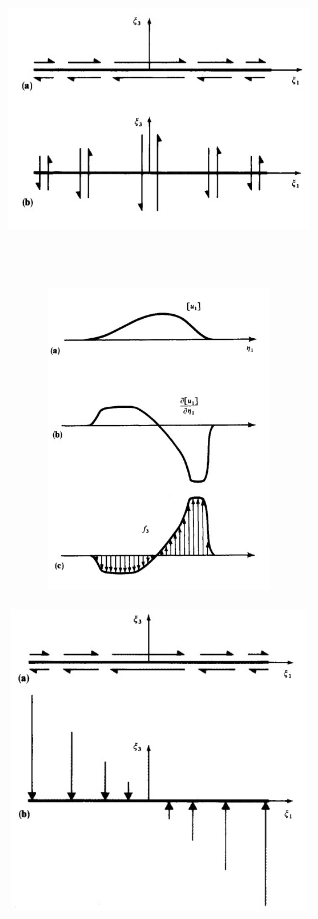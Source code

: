 \documentclass{beamer}
\begin{document}
\begin{frame}
	\begin{figure}[htb]
		\centering
		\includegraphics[width= 8cm, height= 8cm]{distribuicao}
	\end{figure}
\end{frame}

\begin{frame}
	\begin{figure}[htb]
		\centering
		\includegraphics[width= 8cm, height= 8cm]{terceira}
	\end{figure}
\end{frame}

\begin{frame}
	\begin{figure}[htb]
		\centering
		\includegraphics[width= 8cm, height= 8cm]{forca}
	\end{figure}
\end{frame}
\end{document}
